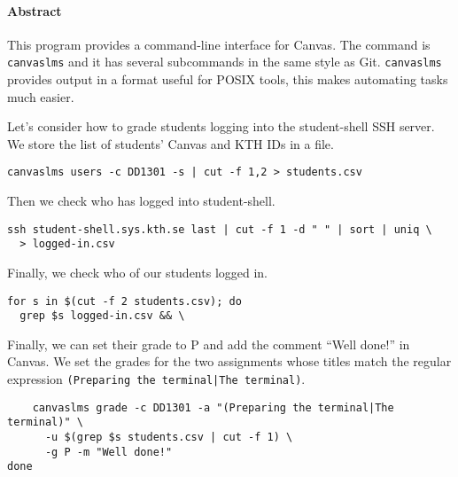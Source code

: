\paragraph{Abstract}


This program provides a command-line interface for Canvas.
The command is \texttt{canvaslms} and it has several subcommands in the same 
style as Git.
\texttt{canvaslms} provides output in a format useful for POSIX tools, this 
makes automating tasks much easier.

Let's consider how to grade students logging into the student-shell SSH server.
We store the list of students' Canvas and KTH IDs in a file.
\begin{verbatim}
canvaslms users -c DD1301 -s | cut -f 1,2 > students.csv
\end{verbatim}
Then we check who has logged into student-shell.
\begin{verbatim}
ssh student-shell.sys.kth.se last | cut -f 1 -d " " | sort | uniq \
  > logged-in.csv
\end{verbatim}
Finally, we check who of our students logged in.
\begin{verbatim}
for s in $(cut -f 2 students.csv); do
  grep $s logged-in.csv && \
\end{verbatim}
Finally, we can set their grade to P and add the comment \enquote{Well done!} 
in Canvas.
We set the grades for the two assignments whose titles match the regular 
expression \texttt{(Preparing the terminal|The terminal)}.
\begin{verbatim}
    canvaslms grade -c DD1301 -a "(Preparing the terminal|The terminal)" \
      -u $(grep $s students.csv | cut -f 1) \
      -g P -m "Well done!"
done
\end{verbatim}

